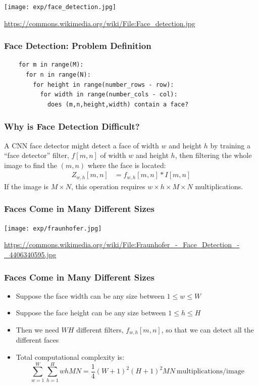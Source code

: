 \documentclass{beamer}
\begin{document}
\begin{frame}
  \centerline{\texttt{[image: exp/face\_detection.jpg]}}
  \url{https://commons.wikimedia.org/wiki/File:Face_detection.jpg}
\end{frame}

\begin{frame}[fragile]
  \frametitle{Face Detection: Problem Definition}

  \begin{lstlisting}
    for m in range(M):
      for n in range(N):
        for height in range(number_rows - row):
          for width in range(number_cols - col):
            does (m,n,height,width) contain a face?
\end{lstlisting}

\end{frame}

\begin{frame}
  \frametitle{Why is Face Detection Difficult?}

  A CNN face detector might detect a face of width $w$ and height $h$
  by training a ``face detector'' filter, $f[m,n]$ of width $w$
  and height $h$, then filtering the whole image to find the $(m,n)$
  where the face is located:
  \begin{align*}
    Z_{w,h}[m,n] &= f_{w,h}[m,n] \ast I[m,n]
  \end{align*}
  If the image is $M\times N$, this operation requires $w\times
  h\times M\times N$ multiplications.
\end{frame}
\begin{frame}
  \frametitle{Faces Come in Many Different Sizes}
  \centerline{\texttt{[image: exp/fraunhofer.jpg]}}
  \url{https://commons.wikimedia.org/wiki/File:Fraunhofer_-_Face_Detection_-_4406340595.jpg}
\end{frame}

\begin{frame}
  \frametitle{Faces Come in Many Different Sizes}
  \begin{itemize}
  \item Suppose the face width can be any size between $1\le w\le W$
  \item Suppose the face height can be any size between $1\le h\le H$
  \item Then we need $WH$ different filters, $f_{w,h}[m,n]$, so that
    we can detect all the different faces
  \item Total computational complexity is:
    \begin{displaymath}
      \sum_{w=1}^W\sum_{h=1}^H whMN = \frac{1}{4}(W+1)^2(H+1)^2MN~\text{multiplications/image}
    \end{displaymath}
  \end{itemize}
\end{frame}
\end{document}
